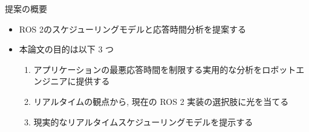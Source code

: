 

\begin{frame}{提案の概要}
    \begin{itemize}
        \item ROS 2のスケジューリングモデルと応答時間分析を提案する
        \item 本論文の目的は以下 3 つ
        \begin{enumerate}
            \item アプリケーションの最悪応答時間を制限する実用的な分析をロボットエンジニアに提供する
            \item リアルタイムの観点から, 現在の ROS 2 実装の選択肢に光を当てる
            \item 現実的なリアルタイムスケジューリングモデルを提示する
        \end{enumerate}
    \end{itemize}
\end{frame}
